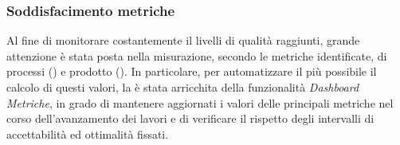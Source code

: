 \subsubsection{Soddisfacimento metriche}
Al fine di monitorare costantemente il livelli di qualità raggiunti, grande attenzione è stata posta nella misurazione, secondo le metriche identificate, di processi () e prodotto (). In particolare, per automatizzare il più possibile il calcolo di questi valori, la  \pragmadb è stata arricchita della funzionalità \textit{Dashboard Metriche}, in grado di mantenere aggiornati i valori delle principali metriche nel corso dell'avanzamento dei lavori e di verificare il rispetto degli intervalli di accettabilità ed ottimalità fissati.\\
